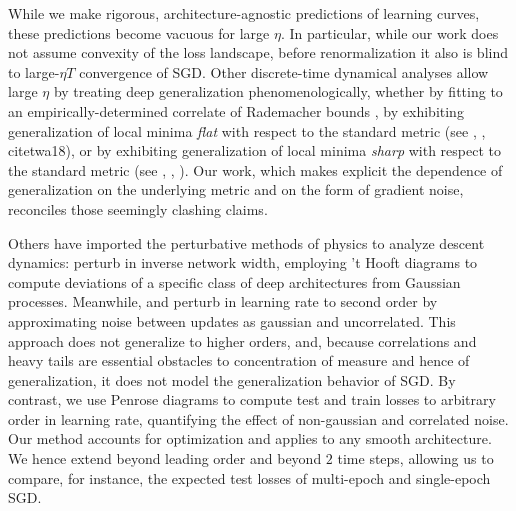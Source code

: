 \documentclass{article}
\begin{document}
    While we make rigorous, architecture-agnostic predictions of learning
    curves, these predictions become vacuous for large $\eta$.  In particular,
    while our work does not assume convexity of the loss landscape, before
    renormalization it also is blind to large-$\eta T$ convergence of SGD.
    Other discrete-time dynamical analyses allow large $\eta$ by treating deep
    generalization phenomenologically, whether by fitting to an
    empirically-determined correlate of Rademacher bounds \citep{li18}, by
    exhibiting generalization of local minima \emph{flat} with respect to the
    standard metric (see \citet{ho17}, \citet{ke17}, citet{wa18}), or by
    exhibiting generalization of local minima \emph{sharp} with respect to the
    standard metric (see \citet{st56}, \citet{di17}, \citet{wu18}).  Our work,
    which makes explicit the dependence of generalization on the underlying
    metric and on the form of gradient noise, reconciles those
    seemingly clashing claims.
    

    Others have imported the perturbative methods of physics to analyze descent
    dynamics:  \citet{dy19} perturb in inverse network width, employing 't
    Hooft diagrams to compute deviations of a specific class of deep
    architectures from Gaussian processes.  Meanwhile, \cite{ch18} and
    \citet{li17} perturb in learning rate to second order by approximating
    noise between updates as gaussian and uncorrelated.  This approach does not
    generalize to higher orders, and, because correlations and heavy tails are
    essential obstacles to concentration of measure and hence of
    generalization, it does not model the generalization behavior of SGD.  By
    contrast, we use Penrose diagrams to compute test and train losses to
    arbitrary order in learning rate, quantifying the effect of non-gaussian
    and correlated noise.  Our method accounts for optimization and applies to
    any smooth architecture.  We hence extend \citet{ro18} beyond leading order
    and beyond $2$ time steps, allowing us to compare, for instance, the
    expected test losses of multi-epoch and single-epoch SGD.

\end{document}

